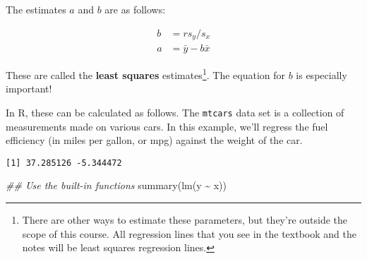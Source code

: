 \documentclass[
  letterpaper,
  DIV=11,
  numbers=noendperiod]{scrreprt}
\newenvironment{Shaded}{\begin{snugshade}}{\end{snugshade}}
\newcommand{\DocumentationTok}[1]{\textcolor[rgb]{0.37,0.37,0.37}{\textit{#1}}}
\newcommand{\FunctionTok}[1]{\textcolor[rgb]{0.28,0.35,0.67}{#1}}
\newcommand{\NormalTok}[1]{\textcolor[rgb]{0.00,0.23,0.31}{#1}}
\newcommand{\OtherTok}[1]{\textcolor[rgb]{0.00,0.23,0.31}{#1}}
\newcommand{\SpecialCharTok}[1]{\textcolor[rgb]{0.37,0.37,0.37}{#1}}
\begin{document}
The estimates \(a\) and \(b\) are as follows:

\begin{align*}
b &= rs_y/s_x\\
a &= \bar y - b\bar x
\end{align*}

These are called the \textbf{least squares} estimates\footnote{There are
  other ways to estimate these parameters, but they're outside the scope
  of this course. All regression lines that you see in the textbook and
  the notes will be least squares regression lines.}. The equation for
\(b\) is especially important!

In R, these can be calculated as follows. The \texttt{mtcars} data set
is a collection of measurements made on various cars. In this example,
we'll regress the fuel efficiency (in miles per gallon, or mpg) against
the weight of the car.

\begin{Shaded}
\end{Shaded}

\begin{verbatim}
[1] 37.285126 -5.344472
\end{verbatim}

\begin{Shaded}
\begin{Highlighting}[]
\DocumentationTok{\#\# Use the built{-}in functions}
\FunctionTok{summary}\NormalTok{(}\FunctionTok{lm}\NormalTok{(y }\SpecialCharTok{\textasciitilde{}}\NormalTok{ x))}
\end{Highlighting}
\end{Shaded}
\end{document}
